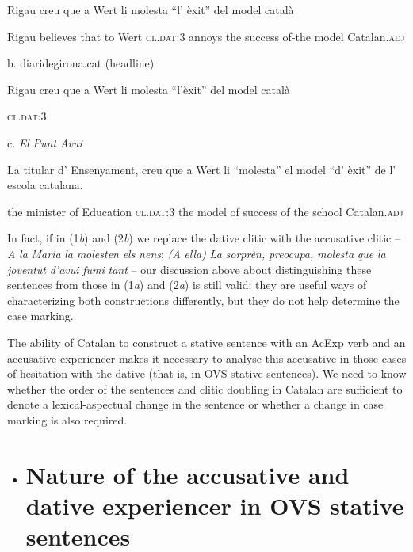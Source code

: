 \documentclass[output=paper,modfonts,nonflat]{langsci/langscibook}
\begin{document}
           Rigau creu       que a   Wert li             molesta “l’   èxit”     del      model català

           Rigau believes that to Wert \textsc{cl.dat:3} annoys   the success of-the model Catalan.\textsc{adj}

      b. diaridegirona.cat (headline)

          Rigau creu que a Wert li             molesta “l’èxit” del model català

                                               \textsc{cl.dat:3}

      c. \textit{El} \textit{Punt} \textit{Avui}

             La  titular    d’ Ensenyament, creu que a Wert li            “molesta” el  model “d’ èxit”    de l’   escola  catalana.

             the minister of Education                                 \textsc{cl.dat:3}                 the model of success of the school Catalan.\textsc{adj}

In fact, if in (1\textit{b}) and (2\textit{b}) we replace the dative clitic with the accusative clitic – \textit{A} \textit{la} \textit{Maria} \textit{la} \textit{molesten} \textit{els} \textit{nens}; \textit{(A} \textit{ella)} \textit{La} \textit{sorprèn,} \textit{preocupa,} \textit{molesta} \textit{que} \textit{la} \textit{joventut} \textit{d’avui} \textit{fumi} \textit{tant} – our discussion above about distinguishing these sentences from those in (1\textit{a}) and (2\textit{a}) is still valid: they are useful ways of characterizing both constructions differently, but they do not help determine the case marking.

The ability of Catalan to construct a stative sentence with an AcExp verb and an accusative experiencer makes it necessary to analyse this accusative in those cases of hesitation with the dative (that is, in OVS stative sentences). We need to know whether the order of the sentences and clitic doubling in Catalan are sufficient to denote a lexical-aspectual change in the sentence or whether a change in case marking is also required.

\section{}
\begin{itemize}
\item \section{Nature of the accusative and dative experiencer in OVS stative sentences}
\end{itemize}
\end{document}
